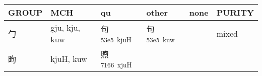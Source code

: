 \documentclass[14pt,a4paper]{scrartcl}
\begin{document}
\begin{longtable}[c]{@{}llllll@{}}
\toprule
\begin{minipage}[b]{0.14\columnwidth}\raggedright\strut
GROUP
\strut\end{minipage} &
\begin{minipage}[b]{0.14\columnwidth}\raggedright\strut
MCH
\strut\end{minipage} &
\begin{minipage}[b]{0.14\columnwidth}\raggedright\strut
qu
\strut\end{minipage} &
\begin{minipage}[b]{0.14\columnwidth}\raggedright\strut
other
\strut\end{minipage} &
\begin{minipage}[b]{0.14\columnwidth}\raggedright\strut
none
\strut\end{minipage} &
\begin{minipage}[b]{0.14\columnwidth}\raggedright\strut
PURITY
\strut\end{minipage}\tabularnewline
\midrule
\endhead
\begin{minipage}[t]{0.14\columnwidth}\raggedright\strut
勹
\strut\end{minipage} &
\begin{minipage}[t]{0.14\columnwidth}\raggedright\strut
gju, kju, kuw
\strut\end{minipage} &
\begin{minipage}[t]{0.14\columnwidth}\raggedright\strut
句\textsuperscript{53e5~kjuH}
\strut\end{minipage} &
\begin{minipage}[t]{0.14\columnwidth}\raggedright\strut
句\textsuperscript{53e5~kuw}
\strut\end{minipage} &
\begin{minipage}[t]{0.14\columnwidth}\raggedright\strut
\strut\end{minipage} &
\begin{minipage}[t]{0.14\columnwidth}\raggedright\strut
mixed
\strut\end{minipage}\tabularnewline
\begin{minipage}[t]{0.14\columnwidth}\raggedright\strut
昫
\strut\end{minipage} &
\begin{minipage}[t]{0.14\columnwidth}\raggedright\strut
kjuH, kuw
\strut\end{minipage} &
\begin{minipage}[t]{0.14\columnwidth}\raggedright\strut
煦\textsuperscript{7166~xjuH}

\end{minipage}
\end{longtable}
\end{document}
